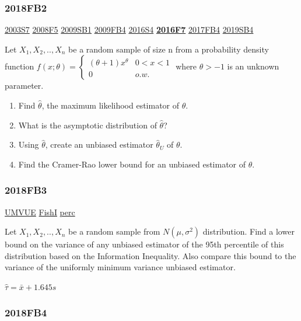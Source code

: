 \documentclass[10pt,twocolumn,portrait]{article}
\begin{document}
\hypertarget{fb2-4}{%
\subsubsection{2018FB2}\label{fb2-4}}

\protect\hyperlink{s7}{2003S7} \protect\hyperlink{f5-3}{2008F5}
\protect\hyperlink{sb1}{2009SB1} \protect\hyperlink{fb4}{2009FB4}
\protect\hyperlink{s4-4}{2016S4}
\textbf{\protect\hyperlink{f7-5}{2016F7}}
\protect\hyperlink{fb4-3}{2017FB4} \protect\hyperlink{sb4-2}{2019SB4}

Let \(X_1,X_2,..,X_n\) be a random sample of size n from a probability
density function
\(f(x;\theta)=\begin{cases}(\theta+1)x^\theta& 0<x<1\\0& o.w.\end{cases}\)
where \(\theta>-1\) is an unknown parameter.

\begin{enumerate}
\def\labelenumi{(\alph{enumi})}
\item
  Find \(\hat\theta\), the maximum likelihood estimator of \(\theta\).
\item
  What is the asymptotic distribution of \(\hat\theta\)?
\item
  Using \(\hat\theta\), create an unbiased estimator \(\hat\theta_U\) of
  \(\theta\).
\item
  Find the Cramer-Rao lower bound for an unbiased estimator of
  \(\theta\).
\end{enumerate}

\hypertarget{fb3-4}{%
\subsubsection{2018FB3}\label{fb3-4}}

\protect\hyperlink{section-5}{UMVUE}
\protect\hyperlink{section-5}{FishI} \protect\hyperlink{perc}{perc}

Let \(X_1,X_2,..,X_n\) be a random sample from \(N(\mu,\sigma^2)\)
distribution. Find a lower bound on the variance of any unbiased
estimator of the 95th percentile of this distribution based on the
Information Inequality. Also compare this bound to the variance of the
uniformly minimum variance unbiased estimator.

\(\hat\tau=\bar x+1.645s\)

\hypertarget{fb4-4}{%
\subsubsection{2018FB4}\label{fb4-4}}
\end{document}
